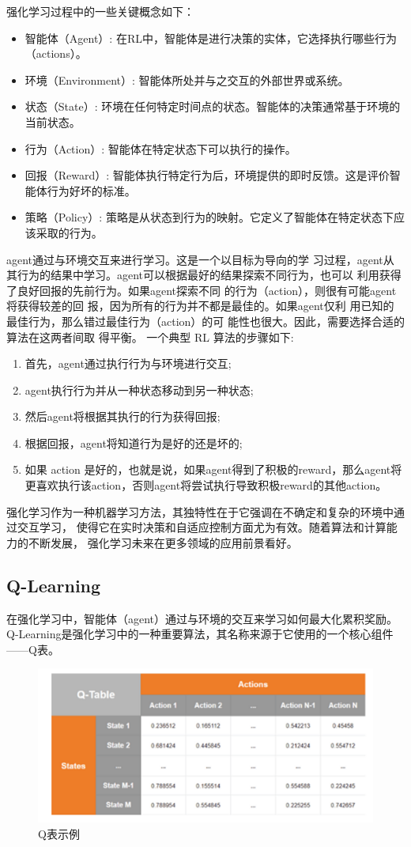\documentclass{thuemp}
\begin{document}
强化学习过程中的一些关键概念如下：
\begin{itemize}
  \item 智能体（Agent）: 在RL中，智能体是进行决策的实体，它选择执行哪些行为（actions）。
  \item 环境（Environment）: 智能体所处并与之交互的外部世界或系统。
  \item 状态（State）: 环境在任何特定时间点的状态。智能体的决策通常基于环境的当前状态。
  \item 行为（Action）: 智能体在特定状态下可以执行的操作。
  \item 回报（Reward）: 智能体执行特定行为后，环境提供的即时反馈。这是评价智能体行为好坏的标准。
  \item 策略（Policy）: 策略是从状态到行为的映射。它定义了智能体在特定状态下应该采取的行为。
\end{itemize}

agent通过与环境交互来进行学习。这是一个以目标为导向的学
习过程，agent从其行为的结果中学习。agent可以根据最好的结果探索不同行为，也可以
利用获得了良好回报的先前行为。如果agent探索不同
的行为（action），则很有可能agent将获得较差的回
报，因为所有的行为并不都是最佳的。如果agent仅利
用已知的最佳行为，那么错过最佳行为（action）的可
能性也很大。因此，需要选择合适的算法在这两者间取
得平衡。
一个典型 RL 算法的步骤如下:
\begin{enumerate}
  \item 首先，agent通过执行行为与环境进行交互;
  \item agent执行行为并从一种状态移动到另一种状态;
  \item 然后agent将根据其执行的行为获得回报;
  \item 根据回报，agent将知道行为是好的还是坏的;
  \item 如果 action 是好的，也就是说，如果agent得到了积极的reward，那么agent将更喜欢执行该action，否则agent将尝试执行导致积极reward的其他action。
\end{enumerate}
强化学习作为一种机器学习方法，其独特性在于它强调在不确定和复杂的环境中通过交互学习，
使得它在实时决策和自适应控制方面尤为有效。随着算法和计算能力的不断发展，
强化学习未来在更多领域的应用前景看好。\\
\vbox{}
\subsection{Q-Learning}
在强化学习中，智能体（agent）通过与环境的交互来学习如何最大化累积奖励。
Q-Learning是强化学习中的一种重要算法，其名称来源于它使用的一个核心组件——Q表。\cite{csdn-ql}
\begin{figure}[H]
  \centering
  \includegraphics[width=0.8\linewidth]{./img/q-table.png}
  \caption{Q表示例}
\end{figure}
\end{document}
